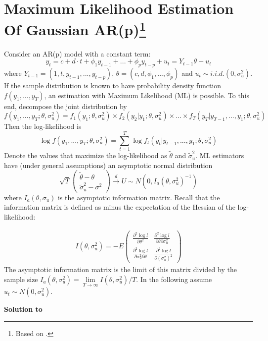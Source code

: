 \documentclass[a4paper]{scrartcl}
\begin{document}
    \section[Maximum Likelihood Estimation Of Gaussian AR(p)]{Maximum Likelihood Estimation Of Gaussian AR(p)\footnote{Based on \cite{Luetkepohl.2004}.}}\label{ex:MLARpGaussian}
    Consider an AR(p) model with a constant term:
    $$ y_t = c + d\cdot t + \phi_1 y_{t-1} +... + \phi_p y_{t-p} +u_{t}=Y_{t-1}\theta + u_t$$
    where $Y_{t-1}=(1,t, y_{t-1},...,y_{t-p})$, $\theta = (c,d,\phi_1,...,\phi_p)$ and $u_t\sim i.i.d.(0,\sigma_u^2)$. If the sample distribution is known to have probability density function $f(y_1,...,y_T)$, an estimation with Maximum Likelihood (ML) is possible. To this end, decompose the joint distribution by
    $$f(y_1,...,y_T;\theta,\sigma_u^2)= f_1(y_1;\theta,\sigma_u^2) \times f_2(y_2|y_1;\theta,\sigma_u^2)\times ... \times f_T(y_T|y_{T-1},...,y_1;\theta,\sigma_u^2)$$ Then the log-likelihood is
    $$\log f(y_1,...,y_T;\theta,\sigma_u^2)=\sum_{t=1}^T \log f_t(y_t|y_{t-1},...,y_1;\theta,\sigma_u^2)$$
    Denote the values that maximize the log-likelihood as $\tilde{\theta}$ and $\tilde{\sigma}_u^2$. ML estimators have (under general assumptions) an asymptotic normal distribution
    $$\sqrt{T}\begin{pmatrix}\tilde{\theta}-\theta\\\tilde{\sigma}^2_u - \sigma^2 \end{pmatrix} \overset{d}{\rightarrow} U \sim N(0,I_a(\theta,\sigma_u^2)^{-1})$$
    where $I_a(\theta,\sigma_u)$ is the asymptotic information matrix. Recall that the information matrix is defined  as minus the expectation of the Hessian of the log-likelihood:
    
    \begin{align*}
        I(\theta,\sigma_u^2) = -E
        \begin{pmatrix}
            \frac{\partial^2 \log l}{\partial \theta^2}                    & \frac{\partial^2 \log l}{\partial \theta  \partial \sigma_u^2} \\
            \frac{\partial^2 \log l}{\partial \sigma_u^2  \partial \theta} & \frac{\partial^2 \log l}{\partial (\sigma_u^2)^2}
        \end{pmatrix}
    \end{align*}
    The asymptotic information matrix is the limit of this matrix divided by the sample size $I_a(\theta, \sigma_u^2)=\lim\limits_{T\rightarrow \infty} I(\theta, \sigma_u^2)/T$.
    In the following assume $u_t\sim N(0,\sigma_u^2)$.
    \begin{solution}\textbf{Solution to }\end{solution}
    
\end{document}
